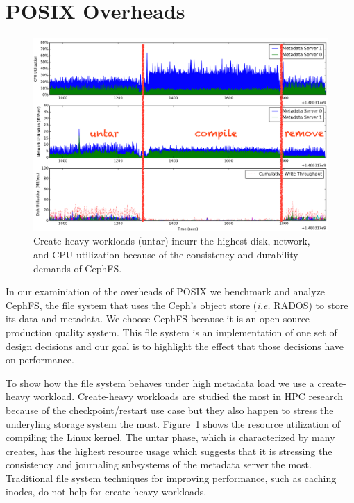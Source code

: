 \section{POSIX Overheads}
\label{sec:posix-overheads}

\begin{figure}[tb]
\centering
\includegraphics[width=1\linewidth]{./graphs/overhead-creates.png}
\caption{Create-heavy workloads (untar) incurr the highest disk, network, and
CPU utilization because of the consistency and durability demands of
CephFS.}\label{fig:overhead-creates}
\end{figure}

In our examiniation of the overheads of POSIX we benchmark and analyze CephFS,
the file system that uses the Ceph's object store ({\it i.e.} RADOS) to store
its data and metadata. We choose CephFS because it is an open-source production
quality system. This file system is an implementation of one set of design
decisions and our goal is to highlight the effect that those decisions have on
performance.

To show how the file system behaves under high metadata load we use a
create-heavy workload. Create-heavy workloads are studied the most in HPC
research because of the checkpoint/restart use case but they also happen to
stress the underyling storage system the most.
Figure~\ref{fig:overhead-creates} shows the resource utilization of compiling
the Linux kernel.  The untar phase, which is characterized by many creates, has
the highest resource usage which suggests that it is stressing the consistency
and journaling subsystems of the metadata server the most. Traditional file
system techniques for improving performance, such as caching inodes, do not
help for create-heavy workloads.

